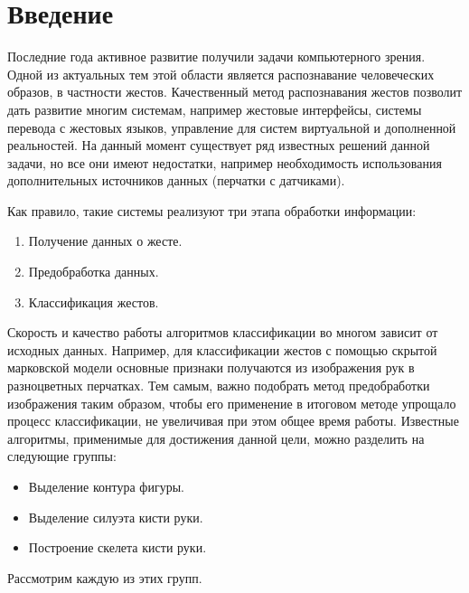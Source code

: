 \section{Введение}
\label{sec:Intro}

Последние года активное развитие получили задачи компьютерного зрения. Одной из актуальных тем этой области является распознавание человеческих образов, в частности жестов. Качественный метод распознавания жестов позволит дать развитие многим системам, например жестовые интерфейсы, системы перевода с жестовых языков, управление для систем виртуальной и дополненной реальностей. На данный момент существует ряд известных решений данной задачи\cite{slr}, но все они имеют недостатки, например необходимость использования дополнительных источников данных (перчатки с датчиками). 

Как правило, такие системы реализуют три этапа обработки информации:

\begin{enumerate}
	\item Получение данных о жесте.
	\item Предобработка данных.
	\item Классификация жестов.
\end{enumerate}

Скорость и качество работы алгоритмов классификации во многом зависит от исходных данных. Например, для классификации жестов с помощью скрытой марковской модели \cite{inproceedings} основные признаки получаются из изображения рук в разноцветных перчатках. Тем самым, важно подобрать метод предобработки изображения таким образом, чтобы его применение в итоговом методе упрощало процесс классификации, не увеличивая при этом общее время работы. Известные алгоритмы, применимые для достижения данной цели, можно разделить на следующие группы:
\begin{itemize}
	\item Выделение контура фигуры.
	\item Выделение силуэта кисти руки.
	\item Построение скелета кисти руки.
\end{itemize}

Рассмотрим каждую из этих групп.